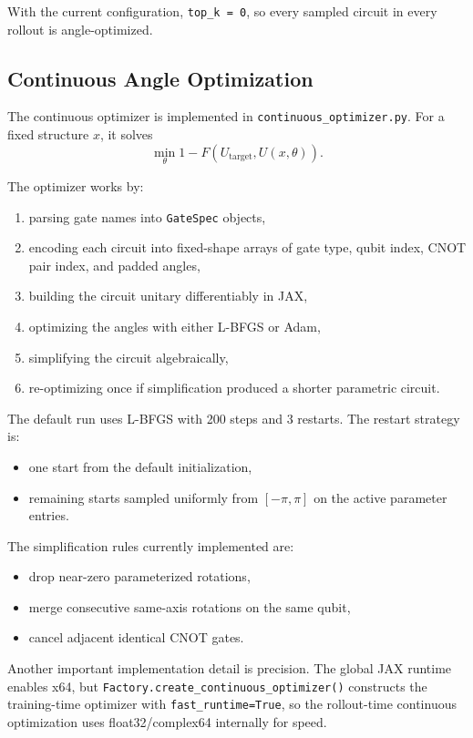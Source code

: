 \documentclass[11pt]{article}
\begin{document}
With the current configuration, \texttt{top\_k = 0}, so every sampled circuit in every rollout is angle-optimized.

\subsection{Continuous Angle Optimization}

The continuous optimizer is implemented in \texttt{continuous\_optimizer.py}. For a fixed structure $x$, it solves
\[
\min_\theta 1 - F(U_{\mathrm{target}}, U(x,\theta)).
\]

The optimizer works by:

\begin{enumerate}[leftmargin=*]
\item parsing gate names into \texttt{GateSpec} objects,
\item encoding each circuit into fixed-shape arrays of gate type, qubit index, CNOT pair index, and padded angles,
\item building the circuit unitary differentiably in JAX,
\item optimizing the angles with either L-BFGS or Adam,
\item simplifying the circuit algebraically,
\item re-optimizing once if simplification produced a shorter parametric circuit.
\end{enumerate}

The default run uses L-BFGS with 200 steps and 3 restarts. The restart strategy is:

\begin{itemize}[leftmargin=*]
\item one start from the default initialization,
\item remaining starts sampled uniformly from $[-\pi,\pi]$ on the active parameter entries.
\end{itemize}

The simplification rules currently implemented are:

\begin{itemize}[leftmargin=*]
\item drop near-zero parameterized rotations,
\item merge consecutive same-axis rotations on the same qubit,
\item cancel adjacent identical CNOT gates.
\end{itemize}

Another important implementation detail is precision. The global JAX runtime enables x64, but \texttt{Factory.create\_continuous\_optimizer()} constructs the training-time optimizer with \texttt{fast\_runtime=True}, so the rollout-time continuous optimization uses float32/complex64 internally for speed.
\end{document}
